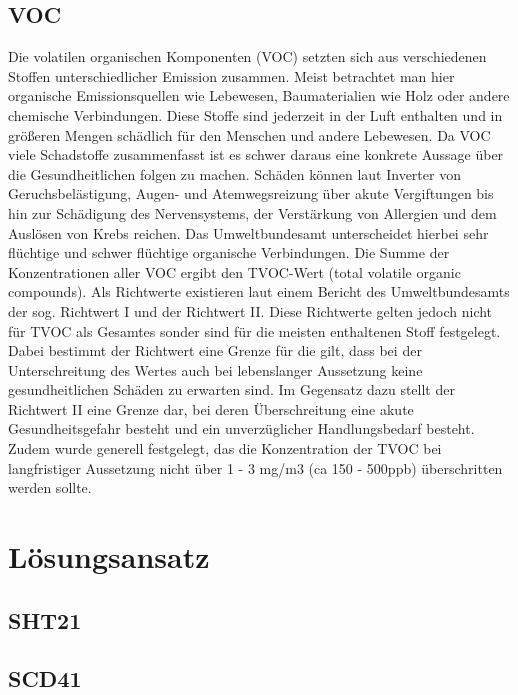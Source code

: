 \documentclass[]{article}
\begin{document}
		\subsection{VOC}
			Die volatilen organischen Komponenten (VOC) setzten sich aus verschiedenen Stoffen unterschiedlicher Emission zusammen. Meist betrachtet man hier organische Emissionsquellen wie Lebewesen, Baumaterialien wie Holz oder andere chemische Verbindungen. Diese Stoffe sind jederzeit in der Luft enthalten und in größeren Mengen schädlich für den Menschen und andere Lebewesen. Da VOC viele Schadstoffe zusammenfasst ist es schwer daraus eine konkrete Aussage über die Gesundheitlichen folgen zu machen. Schäden können laut Inverter \cite{luftquali_inventer} von Geruchsbelästigung, Augen- und Atemwegsreizung  über akute Vergiftungen bis hin zur Schädigung des Nervensystems, der Verstärkung von Allergien und dem Auslösen von Krebs reichen. Das Umweltbundesamt \cite{luftquali_bund_voc} unterscheidet hierbei sehr flüchtige und schwer flüchtige organische Verbindungen. Die Summe der Konzentrationen aller VOC ergibt den TVOC-Wert (total volatile organic compounds). Als Richtwerte existieren laut einem Bericht des Umweltbundesamts \cite{luftquali_bund_rw} der sog. Richtwert I und der Richtwert II. Diese Richtwerte gelten jedoch nicht für TVOC als Gesamtes sonder sind für die meisten enthaltenen Stoff festgelegt. Dabei bestimmt der Richtwert eine Grenze für die gilt, dass bei der Unterschreitung des Wertes auch bei lebenslanger Aussetzung keine gesundheitlichen Schäden zu erwarten sind. Im Gegensatz dazu stellt der Richtwert II eine Grenze dar, bei deren Überschreitung eine akute Gesundheitsgefahr besteht und ein unverzüglicher Handlungsbedarf besteht. Zudem wurde generell festgelegt, das die Konzentration der TVOC bei langfristiger Aussetzung nicht über 1 - 3 mg/m3 (ca 150 - 500ppb) überschritten werden sollte.
	\section{Lösungsansatz} %
		\subsection{SHT21}
		\subsection{SCD41}
\end{document}
